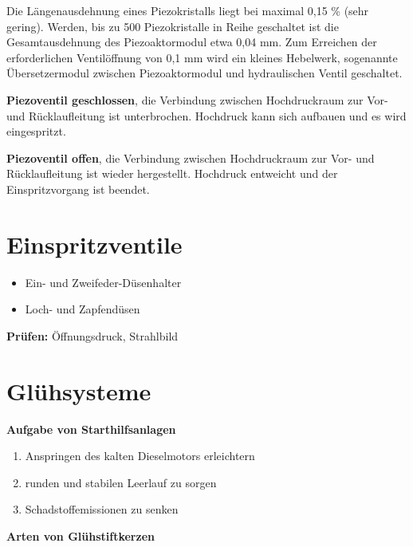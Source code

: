 Die Längenausdehnung eines Piezokristalls liegt bei maximal 0,15 \%
(sehr gering). Werden, bis zu 500 Piezokristalle in Reihe geschaltet ist
die Gesamtausdehnung des Piezoaktormodul etwa 0,04 mm. Zum Erreichen der
erforderlichen Ventilöffnung von 0,1 mm wird ein kleines Hebelwerk,
sogenannte Übersetzermodul zwischen Piezoaktormodul und hydraulischen
Ventil geschaltet.

\textbf{Piezoventil geschlossen}, die Verbindung zwischen Hochdruckraum
zur Vor- und Rücklaufleitung ist unterbrochen. Hochdruck kann sich
aufbauen und es wird eingespritzt.

\textbf{Piezoventil offen}, die Verbindung zwischen Hochdruckraum zur
Vor- und Rücklaufleitung ist wieder hergestellt. Hochdruck entweicht und
der Einspritzvorgang ist beendet.

\section{Einspritzventile}\label{einspritzventile}

\begin{itemize}
\item
  Ein- und Zweifeder-Düsenhalter
\item
  Loch- und Zapfendüsen
\end{itemize}

\textbf{Prüfen:} Öffnungsdruck, Strahlbild

\section{Glühsysteme}\label{gluehsysteme}

\textbf{Aufgabe von Starthilfsanlagen}

\begin{enumerate}
\item
  Anspringen des kalten Dieselmotors erleichtern
\item
  runden und stabilen Leerlauf zu sorgen
\item
  Schadstoffemissionen zu senken
\end{enumerate}

\textbf{Arten von Glühstiftkerzen}

